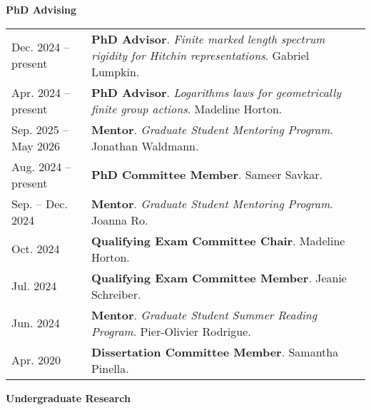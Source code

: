 
    \medskip


    \medskip
    \medskip



    \textbf{\large PhD Advising}
    
    \begin{center}
    {
    \renewcommand{\arraystretch}{1.5}
    \begin{longtable}{p{}  p{}}
     Dec.  2024 --    present & \textbf{PhD Advisor}. \textit{Finite marked length spectrum rigidity for Hitchin representations}.  Gabriel Lumpkin.  \\ 
 Apr.  2024 --    present & \textbf{PhD Advisor}. \textit{Logarithms laws for geometrically finite group actions}.  Madeline Horton.  \\ 
 Sep.  2025 --  May  2026 & \textbf{Mentor}. \textit{Graduate Student Mentoring Program}.  Jonathan Waldmann.  \\ 
 Aug.  2024 --    present & \textbf{PhD Committee Member}.  Sameer Savkar.  \\ 
 Sep.  --  Dec.  2024 & \textbf{Mentor}. \textit{Graduate Student Mentoring Program}.  Joanna Ro.  \\ 
 Oct.  2024 & \textbf{Qualifying Exam Committee Chair}.  Madeline Horton.  \\ 
 Jul.  2024 & \textbf{Qualifying Exam Committee Member}.  Jeanie Schreiber.  \\ 
 Jun.  2024 & \textbf{Mentor}. \textit{Graduate Student Summer Reading Program}.  Pier-Olivier Rodrigue.  \\ 
 Apr.  2020 & \textbf{Dissertation Committee Member}.  Samantha Pinella.  
    \end{longtable}
    } 
    \end{center}

    \vspace{-1em}
    

    \textbf{\large Undergraduate Research}
    
